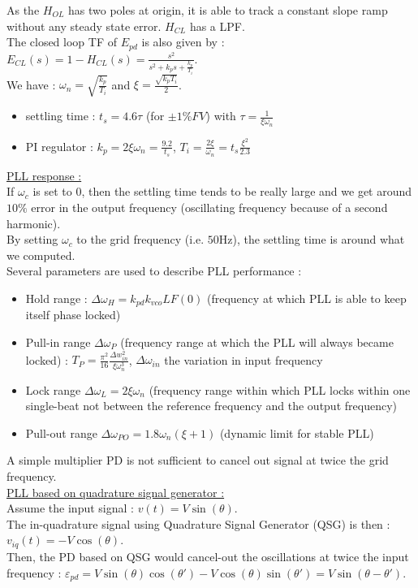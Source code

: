 \documentclass[../main.tex]{subfiles}
\begin{document}
As the $H_{OL}$ has two poles at origin, it is able to track a constant slope ramp without any steady state error. $H_{CL}$ has a LPF.\\

The closed loop TF of $E_{pd}$ is also given by : $E_{CL}(s) = 1- H_{CL}(s) = \frac{s^2}{s^2 + k_ps + \frac{k_p}{T_i}}$.\\

We have : $\omega_n = \sqrt{\frac{k_p}{T_i}}$ and $\xi = \frac{\sqrt{k_pT_i}}{2}$. \begin{itemize}
    \item settling time : $t_s = 4.6 \tau$ (for $\pm 1\% FV$) with $\tau = \frac{1}{\xi \omega_n}$
    \item PI regulator : $k_p = 2\xi \omega_n = \frac{9.2}{t_s}$, $T_i = \frac{2\xi}{\omega_n} = t_s \frac{\xi^2}{2.3}$
\end{itemize}

\quad \underline{PLL response :}\\
If $\omega_c$ is set to 0, then the settling time tends to be really large and we get around $10\%$ error in the output frequency (oscillating frequency because of a second harmonic).\\
By setting $\omega_c$ to the grid frequency (i.e. $50$Hz), the settling time is around what we computed.\\
Several parameters are used to describe PLL performance : \begin{itemize}
    \item Hold range : $\Delta \omega_H= k_{pd} k_{vco} LF(0)$ (frequency at which PLL is able to keep itself phase locked)
    \item Pull-in range $\Delta \omega_P $ (frequency range at which the PLL will always became locked) : $T_P = \frac{\pi^2}{16} \frac{\Delta w_{in}^2}{\xi \omega_n^3}$, $\Delta \omega_{in}$ the variation in input frequency
    \item Lock range $\Delta \omega_L = 2\xi \omega_n$ (frequency range within which PLL locks within one single-beat not between the reference frequency and the output frequency)
    \item Pull-out range $\Delta \omega_{PO} = 1.8 \omega_n (\xi + 1)$ (dynamic limit for stable PLL)
\end{itemize}

\warning A simple multiplier PD is not sufficient to cancel out signal at twice the grid frequency.\\

\quad \underline{PLL based on quadrature signal generator :}\\
Assume the input signal : $v(t) = V \sin(\theta)$. \\
The in-quadrature signal using Quadrature Signal Generator (QSG) is then : $v_{iq}(t) = -V \cos(\theta)$.\\
Then, the PD based on QSG would cancel-out the oscillations at twice the input frequency : $\varepsilon_{pd} = V\sin(\theta) \cos(\theta') - V \cos(\theta) \sin(\theta') = V\sin( \theta - \theta')$.\\
\end{document}
